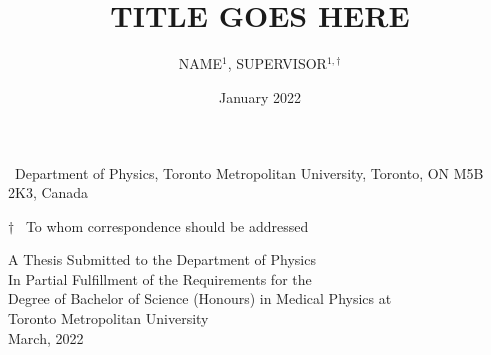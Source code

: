 \title{\\[3em] TITLE GOES HERE}
\author{NAME$^{1}$, SUPERVISOR$^{1, \dagger}$}
\date{January 2022}

\maketitle
\thispagestyle{noNumber}

{\small
\begin{affiliations}
 \item \, Department of Physics, Toronto Metropolitan University, Toronto, ON M5B 2K3, Canada
 \item[$\dagger$] \, To whom correspondence should be addressed
\end{affiliations}
}


\vspace{3em}
\begin{flushright}
\small
A Thesis Submitted to the Department of Physics \\
In Partial Fulfillment of the Requirements for the \\
Degree of Bachelor of Science (Honours) in Medical Physics at \\
Toronto Metropolitan University \\
March, 2022

\end{flushright}